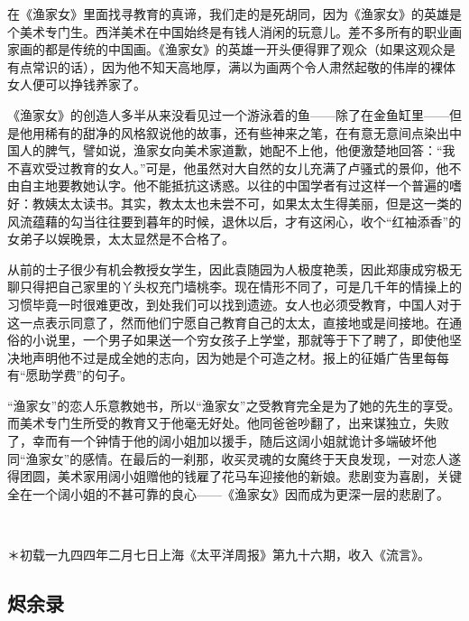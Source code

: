 \par 在《渔家女》里面找寻教育的真谛，我们走的是死胡同，因为《渔家女》的英雄是个美术专门生。西洋美术在中国始终是有钱人消闲的玩意儿。差不多所有的职业画家画的都是传统的中国画。《渔家女》的英雄一开头便得罪了观众（如果这观众是有点常识的话），因为他不知天高地厚，满以为画两个令人肃然起敬的伟岸的裸体女人便可以挣钱养家了。
\par 《渔家女》的创造人多半从来没看见过一个游泳着的鱼——除了在金鱼缸里——但是他用稀有的甜净的风格叙说他的故事，还有些神来之笔，在有意无意间点染出中国人的脾气，譬如说，渔家女向美术家道歉，她配不上他，他便激楚地回答：“我不喜欢受过教育的女人。”可是，他虽然对大自然的女儿充满了卢骚式的景仰，他不由自主地要教她认字。他不能抵抗这诱惑。以往的中国学者有过这样一个普遍的嗜好：教姨太太读书。其实，教太太也未尝不可，如果太太生得美丽，但是这一类的风流蕴藉的勾当往往要到暮年的时候，退休以后，才有这闲心，收个“红袖添香”的女弟子以娱晚景，太太显然是不合格了。
\par 从前的士子很少有机会教授女学生，因此袁随园为人极度艳羡，因此郑康成穷极无聊只得把自己家里的丫头权充门墙桃李。现在情形不同了，可是几千年的情操上的习惯毕竟一时很难更改，到处我们可以找到遗迹。女人也必须受教育，中国人对于这一点表示同意了，然而他们宁愿自己教育自己的太太，直接地或是间接地。在通俗的小说里，一个男子如果送一个穷女孩子上学堂，那就等于下了聘了，即使他坚决地声明他不过是成全她的志向，因为她是个可造之材。报上的征婚广告里每每有“愿助学费”的句子。
\par “渔家女”的恋人乐意教她书，所以“渔家女”之受教育完全是为了她的先生的享受。而美术专门生所受的教育又于他毫无好处。他同爸爸吵翻了，出来谋独立，失败了，幸而有一个钟情于他的阔小姐加以援手，随后这阔小姐就诡计多端破坏他同“渔家女”的感情。在最后的一刹那，收买灵魂的女魔终于天良发现，一对恋人遂得团圆，美术家用阔小姐赠他的钱雇了花马车迎接他的新娘。悲剧变为喜剧，关键全在一个阔小姐的不甚可靠的良心——《渔家女》因而成为更深一层的悲剧了。
\par  
\par ＊初载一九四四年二月七日上海《太平洋周报》第九十六期，收入《流言》。


\subsection{烬余录}

